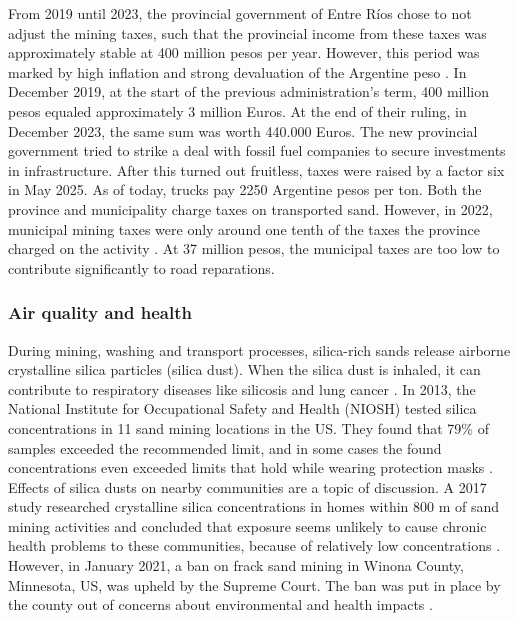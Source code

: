From 2019 until 2023, the provincial government of Entre Ríos chose to not adjust the mining taxes, such that the provincial income from these taxes was approximately stable at 400 million pesos per year. However, this period was marked by high inflation and strong devaluation of the Argentine peso \autocite{bellatoEntreRiosFrigerio2025}. In December 2019, at the start of the previous administration's term, 400 million pesos equaled approximately 3 million Euros. At the end of their ruling, in December 2023, the same sum was worth 440.000 Euros. The new provincial government tried to strike a deal with fossil fuel companies to secure investments in infrastructure. After this turned out fruitless, taxes were raised by a factor six in May 2025. As of today, trucks pay 2250 Argentine pesos per ton. Both the province and municipality charge taxes on transported sand. However, in 2022, municipal mining taxes were only around one tenth of the taxes the province charged on the activity \autocite{novasImpactoAmbientalOculto2022}. At 37 million pesos, the municipal taxes are too low to contribute significantly to road reparations.

\subsubsection{Air quality and health}
During mining, washing and transport processes, silica-rich sands release airborne crystalline silica particles (silica dust). When the silica dust is inhaled, it can contribute to respiratory diseases like silicosis and lung cancer \autocite{physiciansforsocialresponsibilityCompendiumScientificMedical2023}. In 2013, the National Institute for Occupational Safety and Health (NIOSH) tested silica concentrations in 11 sand mining locations in the US. They found that 79\% of samples exceeded the recommended limit, and in some cases the found concentrations even exceeded limits that hold while wearing protection masks \autocite{fogliaSedArena2023}. Effects of silica dusts on nearby communities are a topic of discussion. A 2017 study researched crystalline silica concentrations in homes within 800 m of sand mining activities and concluded that exposure seems unlikely to cause chronic health problems to these communities, because of relatively low concentrations \autocite{petersCommunityAirborneParticulate2017}. However, in January 2021, a ban on frack sand mining in Winona County, Minnesota, US, was upheld by the Supreme Court. The ban was put in place by the county out of concerns about environmental and health impacts \autocite{physiciansforsocialresponsibilityCompendiumScientificMedical2023}.

